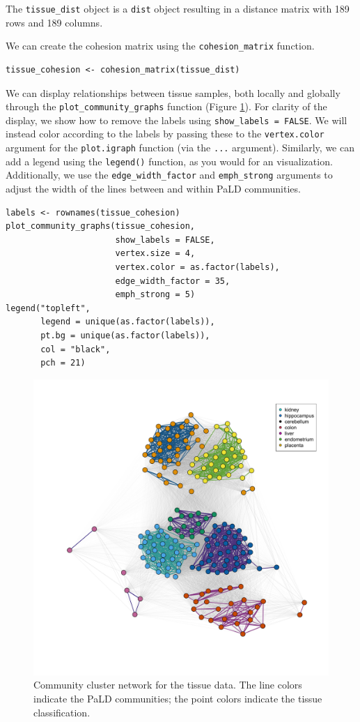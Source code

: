 The \texttt{tissue\_dist} object is a \texttt{dist} object resulting in a distance matrix with 189 rows and 189 columns.

We can create the cohesion matrix using the \texttt{cohesion\_matrix} function.

\begin{verbatim}
tissue_cohesion <- cohesion_matrix(tissue_dist)
\end{verbatim}

We can display relationships between tissue samples, both locally and globally through the \texttt{plot\_community\_graphs} function (Figure \ref{fig:fig4}). For clarity of the display, we show how to remove the labels using \texttt{show\_labels\ =\ FALSE}. We will instead color according to the labels by passing these to the \texttt{vertex.color} argument for the \texttt{plot.igraph} function (via the \texttt{...} argument). Similarly, we can add a legend using the \texttt{legend()} function, as you would for an  visualization. Additionally, we use the \texttt{edge\_width\_factor} and \texttt{emph\_strong} arguments to adjust the width of the lines between and within PaLD communities.

\begin{verbatim}
labels <- rownames(tissue_cohesion)
plot_community_graphs(tissue_cohesion,
                      show_labels = FALSE,
                      vertex.size = 4,
                      vertex.color = as.factor(labels),
                      edge_width_factor = 35,
                      emph_strong = 5)
legend("topleft",
       legend = unique(as.factor(labels)),
       pt.bg = unique(as.factor(labels)),
       col = "black",
       pch = 21)
\end{verbatim}

\begin{figure}[H]
\centering
\includegraphics[width=5in,trim=0in 3in 0in 3in,clip]{fig5} \caption{Community cluster network for the tissue data. The line colors indicate the PaLD communities; the point colors indicate the tissue classification.}\label{fig:fig4}
\end{figure}

